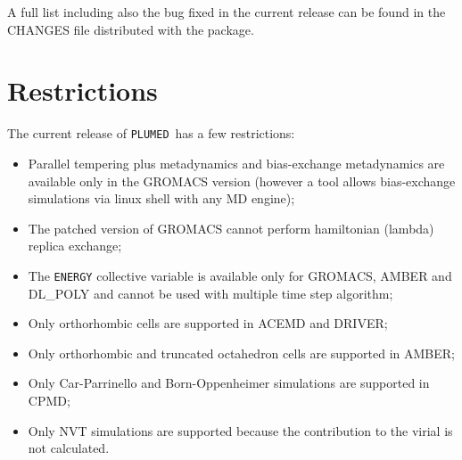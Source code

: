 \documentclass[12pt,fleqn]{report}
\newcommand{\keyword}[1]{\index{Keywords!{\tt #1}} {\tt #1}}
\newcommand{\plumed}{{\tt PLUMED}}
\begin{document}
A full list including also the bug fixed in the current release can be found in the CHANGES file 
distributed with the package.

\section{Restrictions}

The current release of \plumed \ has a few restrictions: 
\begin{itemize}
\item Parallel tempering plus metadynamics and bias-exchange metadynamics are
available only in the GROMACS version (however a tool allows bias-exchange simulations via linux shell with any MD engine); 
\item The patched version of GROMACS cannot perform hamiltonian (lambda) replica
      exchange;
\item The \keyword{ENERGY} collective variable is available only for GROMACS, AMBER and DL\_POLY and cannot be used with multiple time step algorithm;
\item Only orthorhombic cells are supported in ACEMD and DRIVER;
\item Only orthorhombic and truncated octahedron cells are supported in AMBER;
\item Only Car-Parrinello and Born-Oppenheimer simulations are supported in CPMD;
\item Only NVT simulations are supported because the contribution to the virial is not calculated.

\end{itemize}
\end{document}
